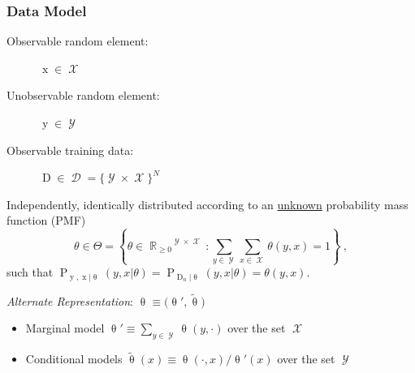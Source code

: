 \documentclass{beamer}
\DeclareMathOperator{\xrm}{\mathrm{x}}
\DeclareMathOperator{\yrm}{\mathrm{y}}
\DeclareMathOperator{\Drm}{\mathrm{D}}
\DeclareMathOperator{\Prm}{\mathrm{P}}
\DeclareMathOperator{\Xcal}{\mathcal{X}}
\DeclareMathOperator{\Ycal}{\mathcal{Y}}
\DeclareMathOperator{\Dcal}{\mathcal{D}}
\DeclareMathOperator{\Rbb}{\mathbb{R}}
\begin{document}
\begin{frame}
\frametitle{Data Model}

\begin{description}
\item[Observable random element:] $\xrm \in \Xcal$
\item[Unobservable random element:] $\yrm \in \Ycal$
\item[Observable training data:] $\Drm \in \Dcal = \{\Ycal \times \Xcal\}^N$
\end{description}

\vspace{0.5em}

Independently, identically distributed according to an \underline{unknown} probability mass function (PMF) 
\begin{equation*}
\theta \in \Theta = \left\{ \theta \in {\Rbb_{\geq 0}}^{\Ycal \times \Xcal}: \sum_{y \in \Ycal} \sum_{x \in \Xcal} \theta(y,x) = 1 \right\} \ ,
\end{equation*}
such that $\Prm_{\yrm,\xrm | \uptheta}(y,x | \theta) = \Prm_{\Drm_n | \uptheta}(y,x | \theta) = \theta(y,x)$.

\vspace{1em}
\textit{Alternate Representation}: $\uptheta \equiv \big( \uptheta',\tilde{\uptheta} \big)$
\begin{itemize}
\item Marginal model $\uptheta' \equiv \sum_{y \in \Ycal} \uptheta(y,\cdot)$ over the set $\Xcal$ 
\item Conditional models $\tilde{\uptheta}(x) \equiv \uptheta(\cdot,x) / \uptheta'(x)$ over the set $\Ycal$
\end{itemize}


\end{frame}
\end{document}
